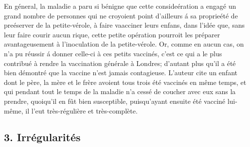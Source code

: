 \setcounter{page}{360}
En géneral, la maladie a paru si bénigne que cette consideération a engagé un grand nombre de personnes qui ne croyoient point d'ailleurs á sa proprieété de preéserver de la petite-vérole, à faire vaacciner leurs enfans, dans l'idée que, sans leur faire courir aucun rique, cette petite opération pourroit les préparer avantageusement à l'inoculation de la petite-vérole. Or, comme en aucun cas, on n'a pu réussir á donner celle-ci à ces petits vaccinés, c'est ce qui a le plus contribué\setcounter{page}{361} à rendre la vaccination générale à Londres; d'autant plus qu'il a été bien démontré que la vaccine n'est jamais contagieuse. L'auteur cite un enfant dont le père, la mère et le frère avoient tous trois été vaccinés en même temps, et qui pendant tout le temps de la maladie n'a cessé de coucher avec eux sans la prendre, quoiqu'il en fût bien susceptible, puisqu'ayant ensuite été vacciné lui-même, il l'eut très-régulière et très-complète.
\setcounter{page}{362}
\subsection{3. Irrégularités}
